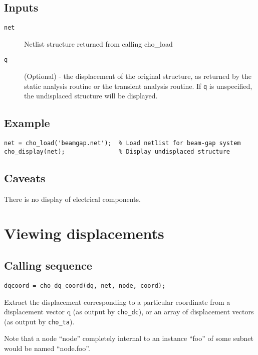 \subsection*{Inputs}

\begin{description}
\item[\texttt{net}]
  Netlist structure returned from calling cho\_load
\item[\texttt{q}]
  (Optional) - the displacement of the original structure,
  as returned by the static analysis routine or the transient
  analysis routine.
  If \texttt{q} is unspecified, the undisplaced structure will
  be displayed.
\end{description}

\subsection*{Example}

\begin{verbatim}
net = cho_load('beamgap.net');  % Load netlist for beam-gap system
cho_display(net);               % Display undisplaced structure
\end{verbatim}

\subsection*{Caveats}

There is no display of electrical components.


\section{Viewing displacements}

\subsection*{Calling sequence}

\begin{verbatim}
dqcoord = cho_dq_coord(dq, net, node, coord);
\end{verbatim}

Extract the displacement corresponding to a particular coordinate
from a displacement vector q (as output by \texttt{cho\_dc}), or an array 
of displacement vectors (as output by \texttt{cho\_ta}).

Note that a node ``node'' completely internal to an instance ``foo''
of some subnet would be named ``node.foo''.

